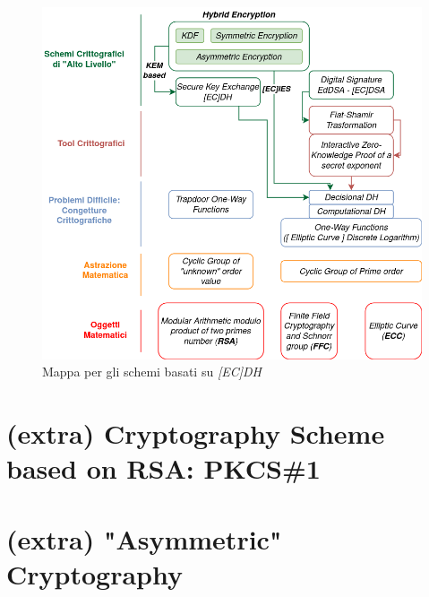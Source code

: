 \begin{flushleft}
    \begin{figure}[h]
        \centering
        \includegraphics[width=\textwidth]{img/md_crypto_2.png}
        \caption{Mappa per gli schemi basati su \textit{[EC]DH}}
    \end{figure}
\end{flushleft}

\section{(extra) Cryptography Scheme based on RSA: PKCS\#1}
\section{(extra) "Asymmetric" Cryptography}